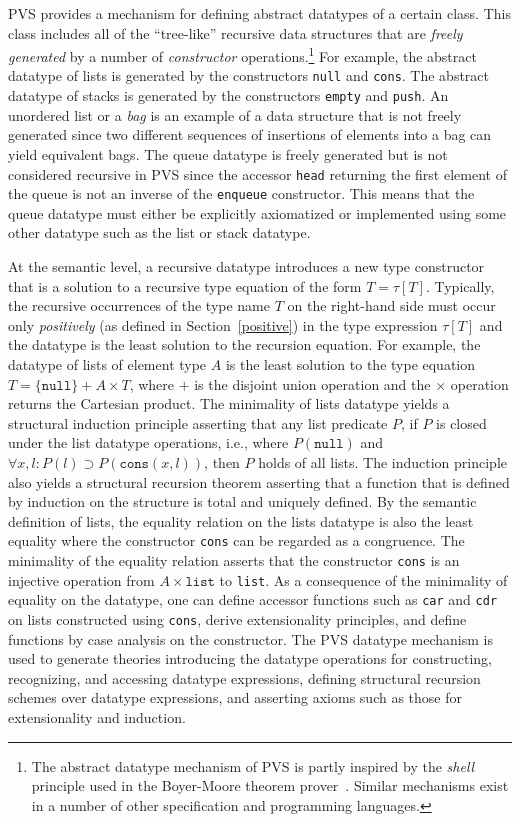 \documentclass[11pt,twoside]{book}
\begin{document}
PVS provides a mechanism for defining abstract datatypes of a certain
class.  This class includes all of the ``tree-like'' recursive data
structures that are \emph{freely generated} by a number of
\emph{constructor} operations.\footnote{The abstract datatype mechanism of
PVS is partly inspired by the \emph{shell} principle used in the
Boyer-Moore theorem prover~\cite{Boyer-Moore79}.  Similar mechanisms exist
in a number of other specification and programming languages.}  For
example, the abstract datatype of lists is generated by the constructors
\texttt{null} and \texttt{cons}\@.  The abstract datatype of stacks is generated
by the constructors \texttt{empty} and \texttt{push}\@.  An unordered list or a
\emph{bag} is an example of a data structure that is not freely generated
since two different sequences of insertions of elements into a bag can
yield equivalent bags.  The queue datatype is freely generated but is not
considered recursive in PVS since the accessor \texttt{head} returning the
first element of the queue is not an inverse of the \texttt{enqueue}
constructor\@.  This means that the queue datatype must either be
explicitly axiomatized or implemented using some other datatype such as
the list or stack datatype.


At the semantic level, a recursive datatype introduces a new type
constructor that is a solution to a recursive type equation of the form $T
= \tau[T]$\@.  Typically, the recursive occurrences of the type name $T$
on the right-hand side must occur only \emph{positively} (as defined in
Section~\ref{positive}) in the type expression $\tau[T]$ and the datatype
is the least solution to the recursion equation\@.  For example, the
datatype of lists of element type $A$ is the least solution to the type
equation $T = \{ \texttt{null}\} + A\times T$, where $+$ is the disjoint
union operation and the $\times$ operation returns the Cartesian product.
The minimality of lists datatype yields a structural induction principle
asserting that any list predicate $P$, if $P$ is closed under the list
datatype operations, i.e., where $P( \texttt{null})$ and $\forall x, l: P(l)
\supset P( \texttt{cons}(x, l))$, then $P$ holds of all lists.  The induction
principle also yields a structural recursion theorem asserting that
a function that is defined by induction on the structure is total and
uniquely defined.  By the semantic definition of lists, the equality
relation on the lists datatype is also the least equality where the
constructor \texttt{cons} can be regarded as a congruence.  The minimality of
the equality relation asserts that the constructor \texttt{cons} is an
injective operation from $A \times \texttt{list}$ to \texttt{list}\@.
As a consequence of the minimality of equality on the datatype, one can
define accessor functions such as \texttt{car} and \texttt{cdr} on lists
constructed using \texttt{cons}, derive extensionality principles, and define
functions by case analysis on the constructor.   The PVS datatype
mechanism is used to generate theories introducing the datatype operations
for constructing, recognizing, and accessing datatype expressions,
defining structural recursion schemes over datatype expressions, 
and asserting axioms such as those for extensionality and induction.  
\end{document}
